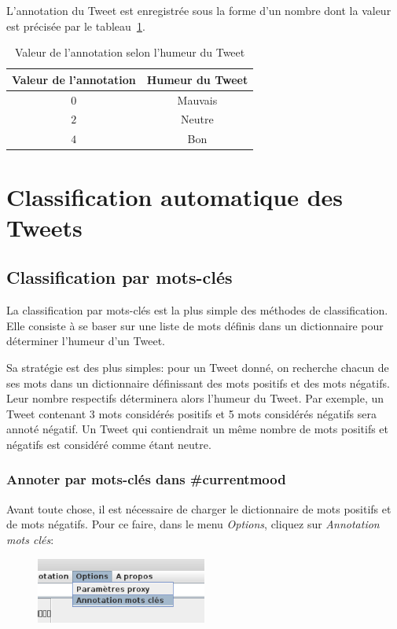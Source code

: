 \documentclass[12pt,a4paper]{report}
\newcommand{\CMName}{\#currentmood}
\begin{document}
L'annotation du Tweet est enregistrée sous la forme d'un nombre dont la valeur
est précisée par le tableau~\ref{tableau-valeurs-annotation}.

\begin{table}[h]
	\centering
	\begin{tabular}{c c}
		\textbf{Valeur de l'annotation}	& \textbf{Humeur du Tweet}\\
		\midrule
		$0$				& Mauvais\\
		\midrule
		$2$				& Neutre\\
		\midrule
		$4$				& Bon
	\end{tabular}
	\caption{Valeur de l'annotation selon l'humeur du Tweet}
\label{tableau-valeurs-annotation}
\end{table}

\chapter{Classification automatique des Tweets}
\label{chapter-classifications}

\section{Classification par mots-clés}
La classification par mots-clés est la plus simple des méthodes de
classification. Elle consiste à se baser sur une liste de mots définis dans un
dictionnaire pour déterminer l'humeur d'un Tweet.

Sa stratégie est des plus simples: pour un Tweet donné, on recherche
chacun de ses mots dans un dictionnaire définissant des mots positifs et des
mots négatifs. Leur nombre respectifs déterminera alors l'humeur du Tweet. Par
exemple, un Tweet contenant 3 mots considérés positifs et 5 mots considérés
négatifs sera annoté négatif. Un Tweet qui contiendrait un même nombre de mots
positifs et négatifs est considéré comme étant neutre.

\subsection{Annoter par mots-clés dans \CMName}
Avant toute chose, il est nécessaire de charger le dictionnaire de mots positifs
et de mots négatifs. Pour ce faire, dans le menu \textit{Options}, cliquez sur
\textit{Annotation mots clés}:

\begin{figure}[h]
	\centering
	\includegraphics[width=0.5\textwidth]{img/capture_menumotcle.png}
\end{figure}
\end{document}
